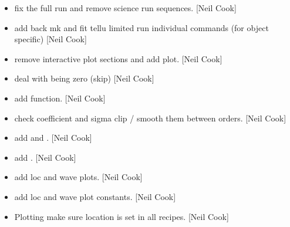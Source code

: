 \documentclass[a4paper,10pt,english]{report}
\begin{document}
\label{\detokenize{misc/changelog:id67}}\begin{itemize}
\item {} 
 \sphinxhyphen{} fix the full run and
remove science run sequences. {[}Neil Cook{]}

\item {} 
 \sphinxhyphen{} add back mk and fit
tellu limited run individual commands (for object specific) {[}Neil
Cook{]}

\item {} 
 \sphinxhyphen{} remove interactive plot sections and add
 plot. {[}Neil Cook{]}

\item {} 
 \sphinxhyphen{} deal with  being zero (skip) {[}Neil
Cook{]}

\item {} 
 \sphinxhyphen{} add  function. {[}Neil Cook{]}

\item {} 
 \sphinxhyphen{} check coefficient and sigma clip /
smooth them between orders. {[}Neil Cook{]}

\item {} 
 \sphinxhyphen{} add  and
. {[}Neil Cook{]}

\item {} 
 \sphinxhyphen{} add . {[}Neil Cook{]}

\item {} 
 \sphinxhyphen{} add loc and wave
plots. {[}Neil Cook{]}

\item {} 
 \sphinxhyphen{} add loc and wave plot
constants. {[}Neil Cook{]}

\item {} 
Plotting \sphinxhyphen{} make sure location is set in all recipes. {[}Neil Cook{]}

\end{itemize}
\end{document}
